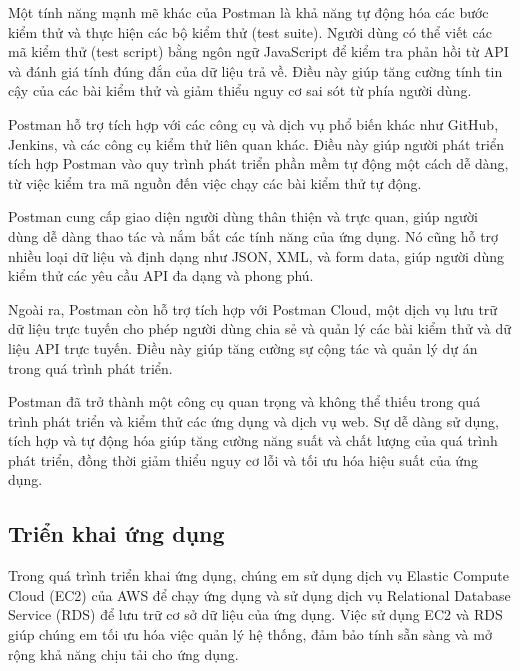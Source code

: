 Một tính năng mạnh mẽ khác của Postman là khả năng tự động hóa các bước kiểm thử và thực hiện các bộ kiểm thử (test suite). Người dùng có thể viết các mã kiểm thử (test script) bằng ngôn ngữ JavaScript để kiểm tra phản hồi từ API và đánh giá tính đúng đắn của dữ liệu trả về. Điều này giúp tăng cường tính tin cậy của các bài kiểm thử và giảm thiểu nguy cơ sai sót từ phía người dùng.

Postman hỗ trợ tích hợp với các công cụ và dịch vụ phổ biến khác như GitHub, Jenkins, và các công cụ kiểm thử liên quan khác. Điều này giúp người phát triển tích hợp Postman vào quy trình phát triển phần mềm tự động một cách dễ dàng, từ việc kiểm tra mã nguồn đến việc chạy các bài kiểm thử tự động.

Postman cung cấp giao diện người dùng thân thiện và trực quan, giúp người dùng dễ dàng thao tác và nắm bắt các tính năng của ứng dụng. Nó cũng hỗ trợ nhiều loại dữ liệu và định dạng như JSON, XML, và form data, giúp người dùng kiểm thử các yêu cầu API đa dạng và phong phú.

Ngoài ra, Postman còn hỗ trợ tích hợp với Postman Cloud, một dịch vụ lưu trữ dữ liệu trực tuyến cho phép người dùng chia sẻ và quản lý các bài kiểm thử và dữ liệu API trực tuyến. Điều này giúp tăng cường sự cộng tác và quản lý dự án trong quá trình phát triển.

Postman đã trở thành một công cụ quan trọng và không thể thiếu trong quá trình phát triển và kiểm thử các ứng dụng và dịch vụ web. Sự dễ dàng sử dụng, tích hợp và tự động hóa giúp tăng cường năng suất và chất lượng của quá trình phát triển, đồng thời giảm thiểu nguy cơ lỗi và tối ưu hóa hiệu suất của ứng dụng.

\subsection{Triển khai ứng dụng}
Trong quá trình triển khai ứng dụng, chúng em sử dụng dịch vụ Elastic Compute
 Cloud (EC2) của AWS để chạy ứng dụng và sử dụng dịch vụ Relational Database Service
  (RDS) để lưu trữ cơ sở dữ liệu của ứng dụng. Việc sử dụng EC2 và RDS giúp
   chúng em tối ưu hóa việc quản lý hệ thống, đảm bảo tính sẵn sàng và
    mở rộng khả năng chịu tải cho ứng dụng.

